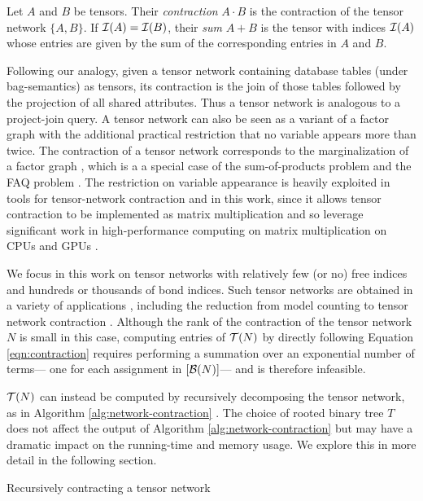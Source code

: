 Let $A$ and $B$ be tensors. Their \emph{contraction} $A \cdot B$ is the contraction of the tensor network $\{A, B\}$. If $\mathcal{I}(A) = \mathcal{I}(B)$, their \emph{sum} $A+B$ is the tensor with indices $\mathcal{I}(A)$ whose entries are given by the sum of the corresponding entries in $A$ and $B$.

Following our analogy, given a tensor network containing database tables (under bag-semantics) as tensors, its contraction is the join of those tables followed by the projection of all shared attributes. Thus a tensor network is analogous to a project-join query. A tensor network can also be seen as a variant of a factor graph \cite{KFL01} with the additional practical restriction that no variable appears more than twice. The contraction of a tensor network corresponds to the marginalization of a factor graph \cite{RS17}, which is a a special case of the sum-of-products problem \cite{BDP09,dechter99} and the FAQ problem \cite{KNR16}. The restriction on variable appearance is heavily exploited in tools for tensor-network contraction and in this work, since it allows tensor contraction to be implemented as matrix multiplication and so leverage significant work in high-performance computing on matrix multiplication on CPUs \cite{LHKK77} and GPUs \cite{FSH04}.

We focus in this work on tensor networks with relatively few (or no) free indices and hundreds or thousands of bond indices. Such tensor networks are obtained in a variety of applications \cite{Cichocki14,DLVR18}, including the reduction from model counting to tensor network contraction \cite{BMT15}. Although the rank of the contraction of the tensor network $N$ is small in this case, computing entries of $\mathcal{T}(N)$ by
directly following Equation \ref{eqn:contraction} requires performing a summation over an exponential number of terms--- one for each assignment in $[\mathcal{B}(N)]$--- and is therefore infeasible.

$\mathcal{T}(N)$ can instead be computed by recursively decomposing the tensor network, as in Algorithm \ref{alg:network-contraction} \cite{EP14}. The choice of rooted binary tree $T$ does not affect the output of Algorithm \ref{alg:network-contraction} but may have a dramatic impact on the running-time and memory usage. We explore this in more detail in the following section.

\begin{algorithm*}[t]
    \label{alg:network-contraction}
    \caption{Recursively contracting a tensor network}
    
    \DontPrintSemicolon
\end{algorithm*}

